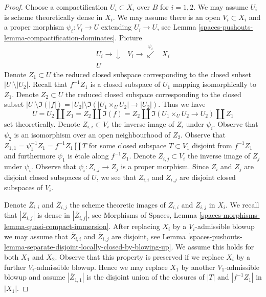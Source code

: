 \begin{proof}
Choose a compactification $U_i \subset X_i$ over $B$ for $i = 1, 2$. We may
assume $U_i$ is scheme theoretically dense in $X_i$. We may assume there
is an open $V_i \subset X_i$ and a proper morphism
$\psi_i : V_i \to U$ extending $U_i \to U$, see
Lemma \ref{spaces-pushouts-lemma-compactification-dominates}. Picture
$$
\begin{array}{ccc}U_i \longrightarrow\downarrow & V_i \longrightarrow\overset{\psi_i}{\swarrow} & X_i \\ U &  & \end{array}
$$
Denote $Z_1 \subset U$ the reduced closed subspace corresponding
to the closed subset $|U| \setminus |U_2|$. Recall that $f^{-1}Z_1$
is a closed subspace of $U_1$ mapping isomorphically to $Z_1$.
Denote $Z_2 \subset U$ the reduced closed subspace corresponding
to the closed subset $|U| \setminus \Im(|f|) =
|U_2| \setminus \Im(|U_1 \times_U U_2| \to |U_2|)$.
Thus we have
$$
U = U_2 \amalg Z_1 = Z_2 \amalg \Im(f) =
Z_2 \amalg \Im(U_1 \times_U U_2 \to U_2) \amalg Z_1
$$
set theoretically. Denote $Z_{i, i} \subset V_i$ the inverse image of $Z_i$
under $\psi_i$. Observe that $\psi_2$ is an isomorphism over an open
neighbourhood of $Z_2$. Observe that
$Z_{1, 1} = \psi_1^{-1}Z_1 = f^{-1}Z_1 \amalg T$ for some
closed subspace $T \subset V_1$ disjoint from $f^{-1}Z_1$ and furthermore
$\psi_1$ is \'etale along $f^{-1}Z_1$.
Denote $Z_{i, j} \subset V_i$ the inverse image of $Z_j$ under $\psi_i$.
Observe that $\psi_i : Z_{i, j} \to Z_j$ is a proper morphism.
Since $Z_i$ and $Z_j$ are disjoint closed subspaces of $U$, we see that
$Z_{i, i}$ and $Z_{i, j}$ are disjoint closed subspaces of $V_i$.

\medskip\noindent
Denote $\overline{Z}_{i, i}$ and $\overline{Z}_{i, j}$ the
scheme theoretic images of $Z_{i, i}$ and $Z_{i, j}$ in $X_i$.
We recall that $|Z_{i, j}|$ is dense in $|\overline{Z}_{i, j}|$, see
Morphisms of Spaces, Lemma
\ref{spaces-morphisms-lemma-quasi-compact-immersion}.
After replacing $X_i$ by a $V_i$-admissible blowup we may assume that
$\overline{Z}_{i, i}$ and $\overline{Z}_{i, j}$ are disjoint, see
Lemma \ref{spaces-pushouts-lemma-separate-disjoint-locally-closed-by-blowing-up}.
We assume this holds for both $X_1$ and $X_2$.
Observe that this property is preserved if we replace $X_i$
by a further $V_i$-admissible blowup. Hence we may replace $X_1$ by another
$V_1$-admissible blowup and assume $|\overline{Z}_{1, 1}|$
is the disjoint union of the closures of $|T|$ and $|f^{-1}Z_1|$ in $|X_1|$.


\end{proof}
